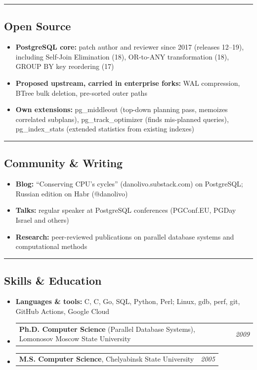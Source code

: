 \documentclass[11pt,letterpaper]{article}
\makeatletter
\newcommand{\headerrow}[2]
{\begin{tabular*}{\linewidth}{l@{\extracolsep{\fill}}r}
#1 &
#2 \\
\end{tabular*}}
\newcommand{\CPP}
{C\nolinebreak[4]\hspace{-.05em}\raisebox{.22ex}{\footnotesize\bf ++}}
\makeatother
\begin{document}
\hrule
\vspace{-1em}
\subsection*{\Large Open Source}

\begin{itemize}[leftmargin=1em,noitemsep]
	\item \textbf{PostgreSQL core:} patch author and reviewer since 2017 (releases 12--19), including
		Self-Join Elimination (18), OR-to-ANY transformation (18), GROUP BY key reordering (17)
	\item \textbf{Proposed upstream, carried in enterprise forks:} WAL compression, BTree
		bulk deletion, pre-sorted outer paths
	\item \textbf{Own extensions:} pg\_middleout (top-down planning pass, memoizes
		correlated subplans), pg\_track\_optimizer (finds mis-planned queries),
		pg\_index\_stats (extended statistics from existing indexes)
\end{itemize}

\hrule
\vspace{-1em}
\subsection*{\Large Community \& Writing}

\begin{itemize}[leftmargin=1em,noitemsep]
	\item \textbf{Blog:} ``Conserving CPU's cycles'' (danolivo.substack.com) on PostgreSQL; Russian edition on Habr (@danolivo)
	\item \textbf{Talks:} regular speaker at PostgreSQL conferences (PGConf.EU, PGDay Israel and others)
	\item \textbf{Research:} peer-reviewed publications on parallel database systems and computational methods
\end{itemize}

\hrule
\vspace{-1em}
\subsection*{\Large Skills \& Education}

\begin{itemize}[leftmargin=1em,noitemsep]
	\item \textbf{Languages \& tools:} C, \CPP, Go, SQL, Python, Perl; Linux, gdb, perf, git, GitHub Actions, Google Cloud
	\item \headerrow{\textbf{Ph.D. Computer Science} (Parallel Database Systems), Lomonosov Moscow State University}{\emph{2009}}
	\item \headerrow{\textbf{M.S. Computer Science}, Chelyabinsk State University}{\emph{2005}}
\end{itemize}
\end{document}
